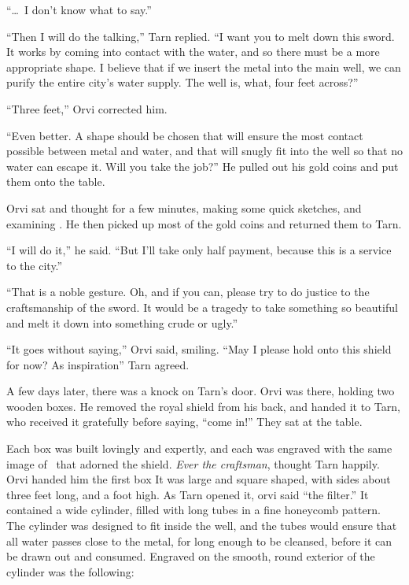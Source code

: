 ``\ldots\ I don't know what to say.''

``Then I will do the talking,'' Tarn replied.  ``I want you to melt down this sword.  It works by coming into contact with the water, and so there must be a more appropriate shape.  I believe that if we insert the metal into the main well, we can purify the entire city's water supply.  The well is, what, four feet across?''

``Three feet,'' Orvi corrected him.

``Even better.  A shape should be chosen that will ensure the most contact possible between metal and water, and that will snugly fit into the well so that no water can escape it.  Will you take the job?''  He pulled out his gold coins and put them onto the table.

Orvi sat and thought for a few minutes, making some quick sketches, and examining \kildir.  He then picked up most of the gold coins and returned them to Tarn.

``I will do it,'' he said.  ``But I'll take only half payment, because this is a service to the city.''

``That is a noble gesture.  Oh, and if you can, please try to do justice to the craftsmanship of the sword.  It would be a tragedy to take something so beautiful and melt it down into something crude or ugly.''

``It goes without saying,'' Orvi said, smiling.  ``May I please hold onto this shield for now?  As inspiration''  Tarn agreed.

\divider

A few days later, there was a knock on Tarn's door.  Orvi was there, holding two wooden boxes.  He removed the royal shield from his back, and handed it to Tarn, who received it gratefully before saying, ``come in!''  They sat at the table.

Each box was built lovingly and expertly, and each was engraved with the same image of \valdunmir\ that adorned the shield.  \emph{Ever the craftsman}, thought Tarn happily.  Orvi handed him the first box  It was large and square shaped, with sides about three feet long, and a foot high.  As Tarn opened it, orvi said ``the filter.''  It contained a wide cylinder, filled with long tubes in a fine honeycomb pattern.  The cylinder was designed to fit inside the well, and the tubes would ensure that all water passes close to the metal, for long enough to be cleansed, before it can be drawn out and consumed.  Engraved on the smooth, round exterior of the cylinder was the following:

